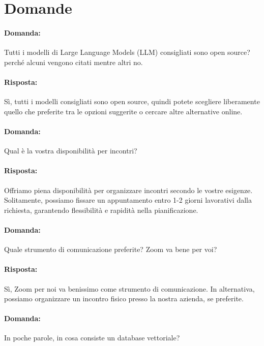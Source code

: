 \documentclass[a4paper, 12pt]{article}
\begin{document}
\section{Domande}
\paragraph{Domanda:} Tutti i modelli di Large Language Models (LLM) consigliati sono open source? perché alcuni vengono citati mentre altri no.
\paragraph{Risposta:} Sì, tutti i modelli consigliati sono open source, quindi potete scegliere liberamente quello che preferite tra le opzioni suggerite o cercare altre alternative online.

\vspace{1.2cm}

\paragraph{Domanda:} Qual è la vostra disponibilità per incontri?
\paragraph{Risposta:} Offriamo piena disponibilità per organizzare incontri secondo le vostre esigenze. Solitamente, possiamo fissare un appuntamento entro 1-2 giorni lavorativi dalla richiesta, garantendo flessibilità e rapidità nella pianificazione.

\vspace{1.2cm}

\paragraph{Domanda:} Quale strumento di comunicazione preferite? Zoom va bene per voi?
\paragraph{Risposta:} Sì, Zoom per noi va benissimo come strumento di comunicazione. In alternativa, possiamo organizzare un incontro fisico presso la nostra azienda, se preferite.

\vspace{1.2cm}

\paragraph{Domanda:} In poche parole, in cosa consiste un database vettoriale?
\end{document}
